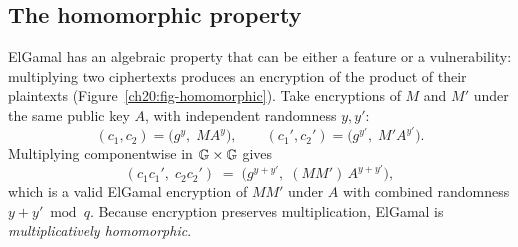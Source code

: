 \subsection{The homomorphic property}
\label{ch20:homomorphic}

ElGamal has an algebraic property that can be either a feature or a vulnerability:
multiplying two ciphertexts produces an encryption of the product of their plaintexts (Figure~\ref{ch20:fig-homomorphic}). Take encryptions of $M$ and
$M'$ under the same public key $A$, with independent randomness $y, y'$:
\[
  (c_1, c_2) = \bigl(g^{y},\; M A^{y}\bigr),
  \qquad
  (c_1', c_2') = \bigl(g^{y'},\; M' A^{y'}\bigr).
\]
Multiplying componentwise in $\mathbb{G} \times \mathbb{G}$ gives
\[
  (c_1 c_1',\; c_2 c_2')
  \;=\;
  \bigl(g^{y+y'},\; (M M')\,A^{y+y'}\bigr),
\]
which is a valid ElGamal encryption of $M M'$ under $A$ with combined randomness $y + y' \bmod q$. Because encryption preserves multiplication, ElGamal is \emph{multiplicatively homomorphic}.

